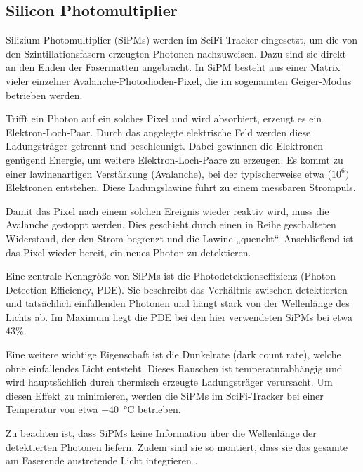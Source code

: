 \subsection{Silicon Photomultiplier}
Silizium-Photomultiplier (SiPMs) werden im SciFi-Tracker eingesetzt, 
um die von den Szintillationsfasern erzeugten Photonen nachzuweisen. 
Dazu sind sie direkt an den Enden der Fasermatten angebracht. 
In SiPM besteht aus einer Matrix vieler einzelner Avalanche-Photodioden-Pixel, 
die im sogenannten Geiger-Modus betrieben werden.

Trifft ein Photon auf ein solches Pixel und wird absorbiert, 
erzeugt es ein Elektron-Loch-Paar. 
Durch das angelegte elektrische Feld werden diese Ladungsträger getrennt und beschleunigt. 
Dabei gewinnen die Elektronen genügend Energie, 
um weitere Elektron-Loch-Paare zu erzeugen. 
Es kommt zu einer lawinenartigen Verstärkung (Avalanche), 
bei der typischerweise etwa ($10^6)$ Elektronen entstehen. 
Diese Ladungslawine führt zu einem messbaren Strompuls.

Damit das Pixel nach einem solchen Ereignis wieder reaktiv wird, 
muss die Avalanche gestoppt werden. 
Dies geschieht durch einen in Reihe geschalteten Widerstand, 
der den Strom begrenzt und die Lawine „quencht“. 
Anschließend ist das Pixel wieder bereit, 
ein neues Photon zu detektieren.

Eine zentrale Kenngröße von SiPMs ist die Photodetektionseffizienz (Photon Detection Efficiency, PDE). 
Sie beschreibt das Verhältnis zwischen detektierten und tatsächlich einfallenden Photonen und hängt stark von der Wellenlänge des Lichts ab. 
Im Maximum liegt die PDE bei den hier verwendeten SiPMs bei etwa $43\%$.

Eine weitere wichtige Eigenschaft ist die Dunkelrate (dark count rate), 
welche ohne einfallendes Licht entsteht. 
Dieses Rauschen ist temperaturabhängig und wird hauptsächlich durch thermisch erzeugte Ladungsträger verursacht. 
Um diesen Effekt zu minimieren, 
werden die SiPMs im SciFi-Tracker bei einer Temperatur von etwa \SI{-40}{\celsius} betrieben.

Zu beachten ist, 
dass SiPMs keine Information über die Wellenlänge der detektierten Photonen liefern. 
Zudem sind sie so montiert, 
dass sie das gesamte am Faserende austretende Licht integrieren \cite{Anleitung}. 


